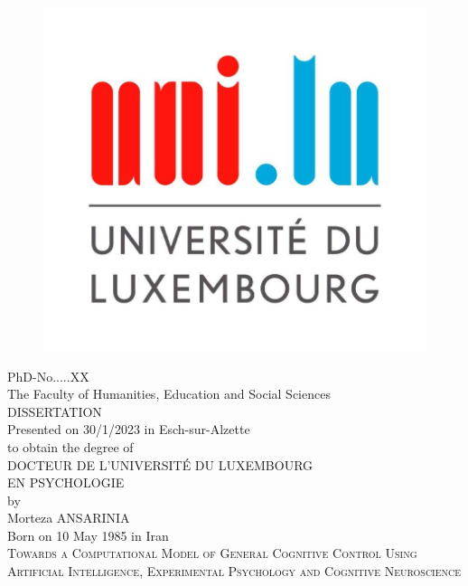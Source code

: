 \thispagestyle{empty}


\begin{figure}
\includegraphics[width=0.3\columnwidth]{resources/logo_uni.jpg}
\centering
\end{figure}

\begin {center}
{\footnotesize{PhD-No.....XX}}\\
{\footnotesize{The Faculty of Humanities, Education and Social Sciences}}\\
\vspace{1.5cm}
\large{DISSERTATION}\\
\vspace{0.2cm}
Presented on 30/1/2023 in Esch-sur-Alzette\\
\vspace{0.2cm}
to obtain the degree of\\
\vspace{1cm}
\textsc{\Large{DOCTEUR DE L'UNIVERSITÉ DU LUXEMBOURG}}\\
\vspace{0.3cm}
\textsc{\Large{EN PSYCHOLOGIE}}\\
\vspace{0.3cm}
by\\
\vspace{0.3cm}
{\Large Morteza ANSARINIA}\\[-10pt]
{\footnotesize Born on 10 May 1985 in Iran}\\
\vspace{1.cm}
{\Large \scshape Towards a Computational Model of General Cognitive Control Using Artificial Intelligence, Experimental Psychology and Cognitive Neuroscience}


\end {center}

\newpage
